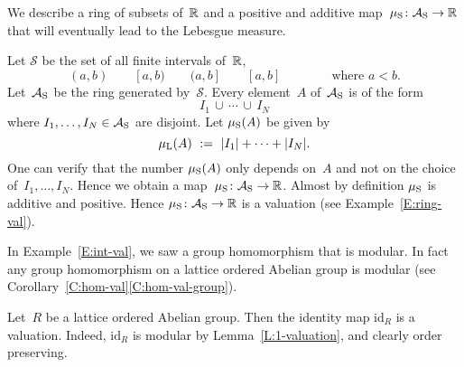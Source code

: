 \documentclass[main.tex]{subfiles}
\begin{document}
%
%
\begin{ex}
\label{E:smeas-val}
We describe a ring of subsets of~$\mathbb{R}$
and a positive and additive 
map~$\mu_{\mathrm{S}}\colon \mathcal{A}_{\mathrm{S}}\rightarrow \mathbb{R}$ that 
will eventually
lead to the Lebesgue measure.

Let $\mathcal{S}$ be the set of all finite intervals of~$\mathbb{R}$,
\begin{equation*}
(a,b)\qquad [a,b)\qquad (a,b]\qquad [a,b]
\qquad\qquad\text{where }a<b.
\end{equation*}
Let~$\mathcal{A}_{\mathrm{S}}$ be the ring generated by~$\mathcal{S}$.
Every element~$A$ of~$\mathcal{A}_{\mathrm{S}}$ is of the form
\begin{equation*}
I_1 \,\cup \,\dotsb \,\cup\, I_N
\end{equation*}
where $I_1,\dotsc,I_N\in \mathcal{A}_{\mathrm{S}}$
are disjoint.
Let $\mu_{\mathrm{S}}(A)$ be given by
\begin{equation*}
\mu_{\mathrm L}(A) \ :=\  |I_1| + \dotsb + |I_N|.
\end{equation*}
One can verify that the number $\mu_{\mathrm{S}}(A)$
only depends on~$A$ and not on the choice of~$I_1,\dotsc,I_N$.
Hence we obtain a map~$\mu_{\mathrm{S}}\colon \mathcal{A}_{\mathrm{S}} \rightarrow \mathbb{R}$.
Almost by definition $\mu_{\mathrm{S}}$ is additive and positive.
Hence $\mu_{\mathrm{S}}\colon\mathcal{A}_{\mathrm{S}}\rightarrow \mathbb{R}$ is a valuation 
(see Example~\ref{E:ring-val}).
\end{ex}


In Example~\ref{E:int-val},
we saw a group homomorphism that is modular.
In fact any group homomorphism
on a lattice ordered Abelian group is modular
(see Corollary~\ref{C:hom-val}\ref{C:hom-val-group}).
\begin{ex}
\label{E:1-valuation}
Let~$R$ be a lattice ordered Abelian group.
Then the identity map $\mathrm{id}_R$ is a valuation.
Indeed, $\mathrm{id}_R$ is modular by Lemma~\ref{L:1-valuation},
and clearly order preserving.
\end{ex}
\end{document}
